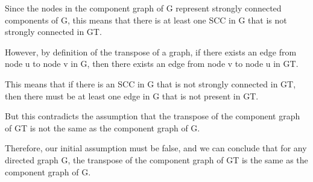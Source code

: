 \documentclass{article}
\begin{document}
Since the nodes in the component graph of G represent strongly connected components of G, this means that there is at least one SCC in G that is not strongly connected in GT.\newline


However, by definition of the transpose of a graph, if there exists an edge from node u to node v in G, then there exists an edge from node v to node u in GT.\newline


This means that if there is an SCC in G that is not strongly connected in GT, then there must be at least one edge in G that is not present in GT.\newline


But this contradicts the assumption that the transpose of the component graph of GT is not the same as the component graph of G.\newline


Therefore, our initial assumption must be false, and we can conclude that for any directed graph G, the transpose of the component graph of GT is the same as the component graph of G.\newline
\end{document}
